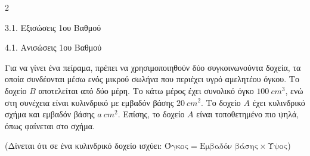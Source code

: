 \begin{ylh}{2}
    \item 3.1. Εξισώσεις 1ου Βαθμού
    \item 4.1. Ανισώσεις 1ου Βαθμού
\end{ylh}

Για να γίνει ένα πείραμα, πρέπει να χρησιμοποιηθούν δύο συγκοινωνούντα δοχεία, τα οποία συνδέονται μέσω ενός μικρού σωλήνα που περιέχει υγρό αμελητέου όγκου. Το δοχείο $B$ αποτελείται από δύο μέρη. Το κάτω μέρος έχει συνολικό όγκο $100\ cm^{3}$, ενώ στη συνέχεια είναι κυλινδρικό με εμβαδόν βάσης $20\ cm^{2}$. Το δοχείο $A$ έχει κυλινδρικό σχήμα και εμβαδόν βάσης $a\ cm^{2}$. Επίσης, το δοχείο $A$ είναι τοποθετημένο πιο ψηλά, όπως φαίνεται στο σχήμα.

(Δίνεται ότι σε ένα κυλινδρικό δοχείο ισχύει: $\text{Όγκος} = \text{Εμβαδόν βάσης} \times \text{Ύψος}$)

